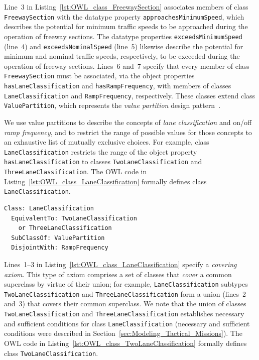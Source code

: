 Line~3 in Listing~\ref{lst:OWL_class_FreewaySection} associates members of class \texttt{FreewaySection} with the datatype property \texttt{approachesMinimumSpeed}, which describes the potential for minimum traffic speeds to be approached during the operation of freeway sections. The datatype properties \texttt{exceedsMinimumSpeed} (line~4) and \texttt{exceedsNominalSpeed} (line~5) likewise describe the potential for minimum and nominal traffic speeds, respectively, to be exceeded during the operation of freeway sections. Lines~6 and~7 specify that every member of class \texttt{FreewaySection} must be associated, via the object properties \texttt{hasLaneClassification} and \texttt{hasRampFrequency}, with members of classes \texttt{LaneClassification} and \texttt{RampFre\-quency}, respectively. These classes extend class \texttt{ValuePartition}, which represents the \emph{value partition} design pattern~\cite{Horridge_2011}.

We use value partitions to describe the concepts of \emph{lane classification} and on/off \emph{ramp frequency}, and to restrict the range of possible values for those concepts to an exhaustive list of mutually exclusive choices. For example, class \texttt{LaneClassification} restricts the range of the object property \texttt{hasLaneClassification} to classes \texttt{TwoLaneClassifica\-tion} and \texttt{ThreeLaneClassification}. The OWL code in Listing~\ref{lst:OWL_class_LaneClassification} formally defines class \texttt{LaneClassification}.

\begin{lstlisting}[caption={OWL code for class \texttt{LaneClassification}},label=lst:OWL_class_LaneClassification]
Class: LaneClassification
  EquivalentTo: TwoLaneClassification
    or ThreeLaneClassification
  SubClassOf: ValuePartition
  DisjointWith: RampFrequency
\end{lstlisting}

Lines~1--3 in Listing~\ref{lst:OWL_class_LaneClassification} specify a \emph{covering axiom}. This type of axiom comprises a set of classes that \emph{cover} a common superclass by virtue of their union; for example, \texttt{LaneClassification} subtypes \texttt{TwoLaneClassification} and \texttt{ThreeLaneClassifi\-cation} form a union (lines~2 and~3) that covers their common superclass. We note that the union of classes \texttt{TwoLaneClassification} and \texttt{ThreeLaneClassification} establishes necessary and sufficient conditions for class \texttt{LaneClassification} (necessary and sufficient conditions were described in Section~\ref{sec:Modeling_Tactical_Missions}). The OWL code in Listing~\ref{lst:OWL_class_TwoLaneClassification} formally defines class \texttt{TwoLaneClassification}.

